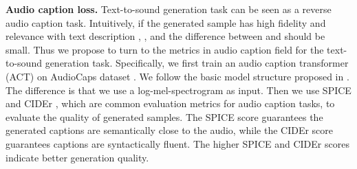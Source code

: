 \documentclass[lettersize,journal]{IEEEtran}
\begin{document}
\textbf{Audio caption loss.} Text-to-sound generation task can be seen as a reverse audio caption \cite{wu2019audio,drossos2020clotho} task. Intuitively, if the generated sample has high fidelity and relevance with text description , {\color{black}{the generated sample can be translated to  using an audio caption system}}, and the difference between  and  should be small. Thus we propose to turn to the metrics in audio caption field for the text-to-sound generation task. Specifically, we first train an audio caption transformer (ACT) \cite{mei2021audio} on AudioCaps dataset \cite{kim2019audiocaps}. We follow the basic model structure proposed in \cite{mei2021audio}. The difference is that we use a  log-mel-spectrogram as input. Then we use SPICE \cite{anderson2016spice} and CIDEr \cite{vedantam2015cider}, which are common evaluation metrics for audio caption tasks, to evaluate the quality of generated samples. The SPICE score guarantees the generated captions are semantically {\color{black}close} to the audio, while the CIDEr score guarantees captions are syntactically fluent. The higher SPICE and CIDEr scores indicate better generation quality.
\end{document}
